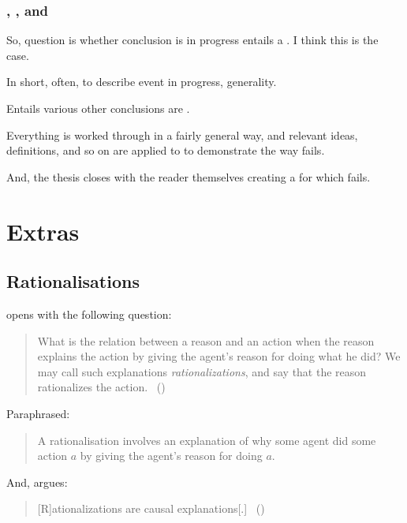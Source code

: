 \documentclass[10pt]{article}
\begin{document}
\subsubsection{, , and }
\label{sec:progex-fingfr1}

\begin{note}
  So, question is whether \eiw{} conclusion is in progress entails a \fingfr{}.
  I think this is the case.

  In short, often, to describe event in progress, generality.

  Entails various other conclusions are .
\end{note}

\begin{note}
  Everything is worked through in a fairly general way, and relevant ideas, definitions, and so on are applied to  to demonstrate the way \issueInclusion{} fails.

  And, the thesis closes with the reader themselves creating a  for which \issueInclusion{} fails.
\end{note}

\newpage

\section{Extras}

\subsection*{Rationalisations}
\label{sec:rationalisations}

\begin{note}
  \citeauthor{Davidson:1963aa} opens  with the following question:

  \begin{quote}
    What is the relation between a reason and an action when the reason explains the action by giving the agent's reason for doing what he did?
    We may call such explanations \emph{rationalizations}, and say that the reason rationalizes the action.%
    \mbox{ }\hfill\mbox{(\citeyear[685]{Davidson:1963aa})}
  \end{quote}

  \noindent%
  Paraphrased:
  \begin{quote}
    A rationalisation involves an explanation of why some agent did some action \(a\) by giving the agent's reason for doing \(a\).
  \end{quote}
  And, \citeauthor{Davidson:1963aa} argues:
  \begin{quote}
    [R]ationalizations are causal explanations[.]%
    \mbox{ }\hfill\mbox{(\citeyear[686]{Davidson:1963aa})}
  \end{quote}
\end{note}
\end{document}
